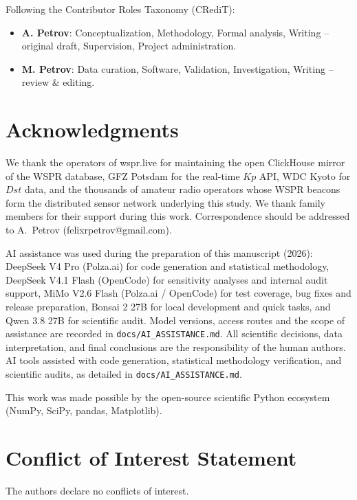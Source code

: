 \documentclass{agujournal2019}
\begin{document}
Following the Contributor Roles Taxonomy (CRediT):
\begin{itemize}
	\item \textbf{A. Petrov}: Conceptualization, Methodology,
	      Formal analysis, Writing -- original draft,
	      Supervision, Project administration.
	\item \textbf{M. Petrov}: Data curation, Software,
	      Validation, Investigation, Writing -- review
	      \& editing.
\end{itemize}


\section*{Acknowledgments}

We thank the operators of wspr.live for maintaining the open ClickHouse mirror
of the WSPR database, GFZ Potsdam for the real-time $Kp$ API, WDC Kyoto for
$Dst$ data, and the thousands of amateur radio operators whose WSPR beacons
form the distributed sensor network underlying this study.
We thank family members for their support during this work.
Correspondence should be addressed to A.~Petrov (felixrpetrov@gmail.com).

AI assistance was used during the preparation of this manuscript (2026):
DeepSeek V4 Pro (Polza.ai) for code generation and statistical methodology,
DeepSeek V4.1 Flash (OpenCode) for sensitivity analyses and internal audit
support, MiMo V2.6 Flash (Polza.ai / OpenCode) for test coverage, bug fixes
and release preparation, Bonsai 2 27B for local development and quick tasks,
and Qwen 3.8 27B for scientific audit. Model versions, access routes and the
scope of assistance are recorded in \texttt{docs/AI\_ASSISTANCE.md}. All
scientific decisions, data interpretation, and final conclusions are the
responsibility of the human authors. AI tools assisted with code generation,
statistical methodology verification, and scientific audits, as detailed in
\texttt{docs/AI\_ASSISTANCE.md}.

This work was made possible by the open-source scientific Python ecosystem
(NumPy, SciPy, pandas, Matplotlib).


\section*{Conflict of Interest Statement}

The authors declare no conflicts of interest.




\end{document}

